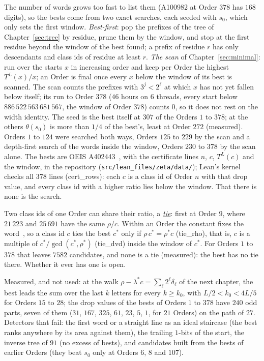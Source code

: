 \documentclass[10pt,a4paper,titlepage]{article}
\makeatletter
\newcommand{\termhere}[1]{\leavevmode
  \Hy@raisedlink{\hyper@anchorstart{term:#1}\hyper@anchorend}}
\newcommand{\keyterm}[2]{\hyperlink{box:#1}{\emph{#2}}}
\newcommand{\lean}[1]{\textsf{#1}}
\makeatother
\begin{document}
The number of words grows too fast to list them (A100982 at Order $378$ has $168$ digits), so
the bests come from two exact searches, each seeded with $s_0$, which only sets the first
window. \emph{Best-first}: pop the prefixes of the tree of Chapter~\ref{sec:tree} by residue, prune them
by the window, and stop at the first residue beyond the window of the best found; a prefix of
residue $r$ has only descendants and class ids of residue at least $r$. \emph{The scan} of
Chapter~\ref{sec:minimal}: run over the starts $x$ in increasing order and keep per Order the highest
$T^L(x)/x$; an Order is final once every $x$ below the window of its best is scanned. The scan counts
the prefixes with $3^j < 2^\ell$ at which $x$ has not yet fallen below itself; its run to Order $378$
($46$ hours on $6$ threads, every start below $886\,522\,563\,681\,567$, the window of Order $378$)
counts $0$, so it does not rest on the width identity. The seed is the best itself at $307$ of the
Orders $1$ to $378$; at the others $\theta(s_0)$ is more than $1/4$ of the best's, least at Order $272$
(measured). Orders $1$ to $124$ were searched both ways, Orders $125$ to $229$ by the scan and a
depth-first search of the words inside the window, Orders $230$ to $378$ by the scan alone. The bests are
OEIS A402443~\cite{OEIS_A402443}, with the certificate lines $n$, $c$, $T^L(c)$
and the window, in the repository (\texttt{src/lean\_files/zeta/data/}); Lean's kernel checks all
$378$ lines (\lean{cert\_rows}): each $c$ is a class id of Order $n$ with that drop value, and every
class id with a higher ratio lies below the window. That there is none is the search.

\termhere{tie}Two class ids of one Order can share their ratio, a \keyterm{tie}{tie}: first at Order $9$, where
$21\,223$ and $25\,691$ have the same $\rho/c$. Within an Order the constant fixes the
word~\cite[Cor.~2.1a]{Lagarias1990}, so a class id $c$ ties the best $c^\ast$ only if
$\rho\,c^\ast = \rho^\ast c$ (\lean{tie\_rho}), that is, $c$ is a multiple of
$c^\ast/\gcd(c^\ast, \rho^\ast)$ (\lean{tie\_dvd}) inside the window of $c^\ast$. For Orders $1$ to
$378$ that leaves $7582$ candidates, and none is a tie (measured): the best has no tie there.
Whether it ever has one is open.

Measured, and not used: at the walk $\rho - \lambda^\ast c = \sum_\ell 2^\ell \delta_\ell$ of the next
chapter, the best leads the sum over the last $k$ letters for every $k \ge k_0$, with
$L/2 < k_0 < 4L/5$ for Orders $15$ to $28$; the drop values of the bests of Orders $1$ to $378$ have
$240$ odd parts, seven of them ($31$, $167$, $325$, $61$, $23$, $5$, $1$, for $21$ Orders) on the path
of $27$. Detectors that fail: the first word or a straight line as an ideal staircase (the best
ranks anywhere by its area against them), the trailing $1$-bits of the start, the inverse tree of
$91$ (no excess of bests), and candidates built from the bests of earlier Orders (they beat $s_0$
only at Orders $6$, $8$ and $107$).
\end{document}
